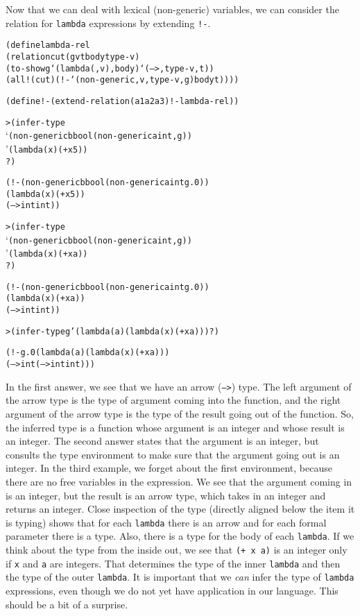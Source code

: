 Now that we can deal with lexical (non-generic) variables, we can
consider the relation for \texttt{lambda} expressions by extending
\texttt{!-}.

\begin{alltt}
(define lambda-rel
  (relation cut (g v t body type-v)
    (to-show g `(lambda (,v) ,body) `(--> ,type-v ,t))
    (all! (cut) (!- `(non-generic ,v ,type-v ,g) body t))))

(define !- (extend-relation (a1 a2 a3) !- lambda-rel))
\end{alltt}

\begin{alltt}
> (infer-type 
    `(non-generic b bool (non-generic a int ,g))
    '(lambda (x) (+ x 5))
    ?)

(!- (non-generic b bool (non-generic a int g.0))
    (lambda (x) (+ x 5))
    (--> int int))
\end{alltt}

\begin{alltt}
> (infer-type
    `(non-generic b bool (non-generic a int ,g))
    '(lambda (x) (+ x a))
    ?)

(!- (non-generic b bool (non-generic a int g.0))
    (lambda (x) (+ x a))
    (--> int int))
\end{alltt}

\begin{alltt}
> (infer-type g '(lambda (a) (lambda (x) (+ x a))) ?)

(!- g.0 (lambda (a) (lambda (x) (+ x a)))
         (--> int (--> int int)))
\end{alltt}

In the first answer, we see that we have an arrow (\texttt{-->})
type.  The left argument of the arrow type is the type of argument
coming into the function, and the right argument of the arrow type is
the type of the result going out of the function.  So, the inferred
type is a function whose argument is an integer and whose result is an
integer.  The second answer states that the argument is an integer,
but consults the type environment to make sure that the argument going
out is an integer.  In the third example, we forget about the first
environment, because there are no free variables in the expression. We
see that the argument coming in is an integer, but the result is an
arrow type, which takes in an integer and returns an integer.  Close
inspection of the type (directly aligned below the item it is typing)
shows that for each \texttt{lambda} there is an arrow and for each
formal parameter there is a type.  Also, there is a type for the body
of each \texttt{lambda}.  If we think about the type from the inside
out, we see that \texttt{(+ x a)} is an integer only if \texttt{x} and
\texttt{a} are integers.  That determines the type of the inner
\texttt{lambda} and then the type of the outer \texttt{lambda}.  It is
important that we \emph{can} infer the type of \texttt{lambda}
expressions, even though we do not yet have application in our language.
This should be a bit of a surprise.

